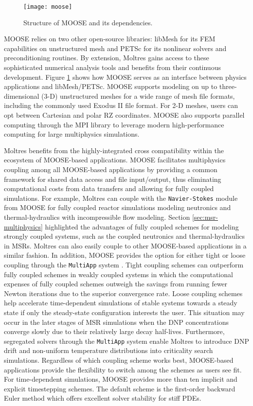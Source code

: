 \begin{figure}[htb!]
	\centering
	\texttt{[image: moose]}
	\caption{Structure of MOOSE and its dependencies.}
	\label{fig:moose}
\end{figure}

MOOSE relies on two other open-source libraries: libMesh
\cite{kirk_libmesh_2006} for its \gls{FEM} capabilities on unstructured mesh
and PETSc \cite{satish_petsc_2019} for its nonlinear solvers and
preconditioning routines. By extension, Moltres gains access to these
sophisticated numerical analysis tools and benefits from their continuous
development. Figure
\ref{fig:moose} shows how MOOSE serves as an interface between physics
applications and libMesh/PETSc. MOOSE supports
modeling on up to three-dimensional (3-D) unstructured meshes for a wide range
of mesh file formats, including the commonly used Exodus II file format. For
2-D meshes, users can opt between Cartesian and polar RZ coordinates. MOOSE
also supports parallel computing through the \gls{MPI} library to leverage
modern high-performance computing for large multiphysics simulations.

Moltres benefits from the highly-integrated cross compatibility within the
ecosystem of MOOSE-based applications. MOOSE facilitates multiphysics coupling
among all MOOSE-based applications by providing a common framework for shared
data access and file input/output, thus eliminating computational costs from
data transfers and allowing for fully coupled simulations. For example, Moltres
can couple with the \texttt{Navier-Stokes} module \cite{peterson_overview_2018}
from MOOSE for fully coupled reactor simulations modeling neutronics and
thermal-hydraulics with incompressible flow modeling. Section
\ref{sec:msr-multiphysics} highlighted the advantages of fully coupled schemes
for modeling strongly coupled systems, such as the coupled
neutronics and thermal-hydraulics in \glspl{MSR}. Moltres can also easily
couple to other MOOSE-based applications in a similar fashion. In
addition, MOOSE
provides the option for either tight or loose coupling through the
\texttt{MultiApp} system \cite{gaston_physics-based_2015}. Tight coupling
schemes can outperform fully coupled schemes in weakly coupled systems in which
the computational expenses of fully coupled schemes outweigh the savings from
running fewer Newton iterations due to the superior convergence rate. Loose
coupling schemes help accelerate time-dependent simulations of
stable systems towards a steady state if only the steady-state
configuration interests the user. This situation may occur in the later
stages of \gls{MSR} simulations when the \gls{DNP}
concentrations converge slowly due to their relatively large decay half-lives.
Furthermore, segregated solvers through the \texttt{MultiApp} system enable
Moltres to introduce \gls{DNP} drift and non-uniform
temperature distributions into criticality search simulations. Regardless of
which coupling scheme works best, MOOSE-based applications provide the flexibility
to switch among the schemes as users see fit. For time-dependent simulations,
MOOSE provides more than ten implicit and explicit timestepping
schemes. The default scheme is the first-order backward Euler
method which offers excellent solver stability for stiff \glspl{PDE}.

